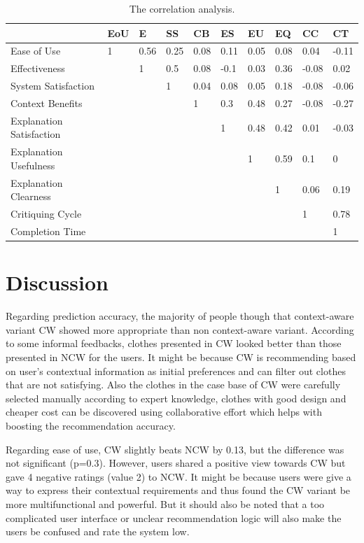 \begin{table}[H]
	\centering
	\caption{The correlation analysis.}
	\label{tab:correlation}
	\begin{tabular}{p{0.9in}p{0.35in}p{0.35in}p{0.35in}p{0.35in}p{0.35in}p{0.35in}p{0.35in}p{0.35in}p{0.35in}}
		 & EoU & E & SS & CB & ES & EU & EQ & CC & CT \\ \hline
		Ease of Use & 1 & 0.56 & 0.25 & 0.08 & 0.11 & 0.05 & 0.08 & 0.04 & -0.11 \\
		Effectiveness &  & 1 & 0.5 & 0.08 & -0.1 & 0.03 & 0.36 & -0.08 & 0.02 \\
		System Satisfaction &  &  & 1 & 0.04 & 0.08 & 0.05 & 0.18 & -0.08 & -0.06 \\
		Context Benefits &  &  &  & 1 & 0.3 & 0.48 & 0.27 & -0.08 & -0.27 \\
		Explanation Satisfaction &  &  &  &  & 1 & 0.48 & 0.42 & 0.01 & -0.03 \\
		Explanation Usefulness &  &  &  &  &  & 1 & 0.59 & 0.1 & 0 \\
		Explanation Clearness &  &  &  &  &  &  & 1 & 0.06 & 0.19 \\
		Critiquing Cycle &  &  &  &  &  &  &  & 1 & 0.78 \\
		Completion Time &  &  &  &  &  &  &  &  & 1 \\ \hline
	\end{tabular}
\end{table}

\section{Discussion} \label{sec:discussion}

Regarding prediction accuracy, the majority of people though that context-aware variant CW showed more appropriate than non context-aware variant. According to some informal feedbacks, clothes presented in CW looked better than those presented in NCW for the users. It might be because CW is recommending based on user's contextual information as initial preferences and can filter out clothes that are not satisfying. Also the clothes in the case base of CW were carefully selected manually according to expert knowledge, clothes with good design and cheaper cost can be discovered using collaborative effort which helps with boosting the recommendation accuracy.

Regarding ease of use, CW slightly beats NCW by 0.13, but the difference was not significant (p=0.3). However, users shared a positive view towards CW but gave 4 negative ratings (value 2) to NCW. It might be because users were give a way to express their contextual requirements and thus found the CW variant be more multifunctional and powerful. But it should also be noted that a too complicated user interface or unclear recommendation logic will also make the users be confused and rate the system low.


